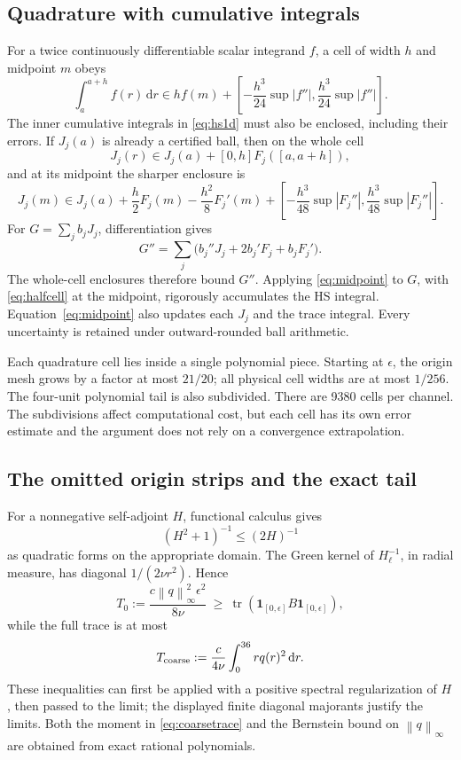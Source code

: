 \documentclass[11pt,a4paper]{article}
\theoremstyle{definition}\newtheorem{definition}[theorem]{Definition}
\theoremstyle{remark}\newtheorem{remark}[theorem]{Remark}
\newcommand{\dd}{\,\mathrm d}
\newcommand{\norm}[1]{\left\|#1\right\|}
\newcommand{\tr}{\operatorname{tr}}
\begin{document}
\subsection{Quadrature with cumulative integrals}
For a twice continuously differentiable scalar integrand \(f\), a cell of width \(h\) and midpoint \(m\) obeys
\begin{equation}\label{eq:midpoint}
 \int_a^{a+h}f(r)\dd r\in h f(m)
 +\left[-\frac{h^3}{24}\sup|f''|,\frac{h^3}{24}\sup|f''|\right].
\end{equation}
The inner cumulative integrals in \eqref{eq:hs1d} must also be enclosed, including their errors. If \(J_j(a)\) is already a certified ball, then on the whole cell
\[
 J_j(r)\in J_j(a)+[0,h]F_j([a,a+h]),
\]
and at its midpoint the sharper enclosure is
\begin{equation}\label{eq:halfcell}
 J_j(m)\in J_j(a)+\frac h2F_j(m)-\frac{h^2}8F_j'(m)
 +\left[-\frac{h^3}{48}\sup|F_j''|,\frac{h^3}{48}\sup|F_j''|\right].
\end{equation}
For \(G=\sum_jb_jJ_j\), differentiation gives
\[
 G''=\sum_j\bigl(b_j''J_j+2b_j'F_j+b_jF_j'\bigr).
\]
The whole-cell enclosures therefore bound \(G''\). Applying \eqref{eq:midpoint} to \(G\), with \eqref{eq:halfcell} at the midpoint, rigorously accumulates the HS integral. Equation~\eqref{eq:midpoint} also updates each \(J_j\) and the trace integral. Every uncertainty is retained under outward-rounded ball arithmetic.

Each quadrature cell lies inside a single polynomial piece. Starting at \(\epsilon\), the origin mesh grows by a factor at most \(21/20\); all physical cell widths are at most \(1/256\). The four-unit polynomial tail is also subdivided. There are 9380 cells per channel. The subdivisions affect computational cost, but each cell has its own error estimate and the argument does not rely on a convergence extrapolation.

\subsection{The omitted origin strips and the exact tail}
For a nonnegative self-adjoint \(H\), functional calculus gives
\[
 (H^2+1)^{-1}\le(2H)^{-1}
\]
as quadratic forms on the appropriate domain. The Green kernel of \(H_\ell^{-1}\), in radial measure, has diagonal \(1/(2\nu r^2)\). Hence
\begin{equation}\label{eq:origintrace}
 T_0:=\frac{c\norm q_\infty^2\epsilon^2}{8\nu}
 \ \ge\ \tr(\boldsymbol1_{[0,\epsilon]}B\boldsymbol1_{[0,\epsilon]}),
\end{equation}
while the full trace is at most
\begin{equation}\label{eq:coarsetrace}
 T_{\rm coarse}:=\frac c{4\nu}\int_0^{36}r q(r)^2\dd r.
\end{equation}
These inequalities can first be applied with a positive spectral regularization of \(H\), then passed to the limit; the displayed finite diagonal majorants justify the limits. Both the moment in \eqref{eq:coarsetrace} and the Bernstein bound on \(\norm q_\infty\) are obtained from exact rational polynomials.
\end{document}

